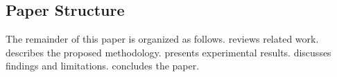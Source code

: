 \subsection{Paper Structure}
\label{subsec:structure}
The remainder of this paper is organized as follows.
 reviews related work.
 describes the proposed methodology.
 presents experimental results.
 discusses findings and limitations.
 concludes the paper.
